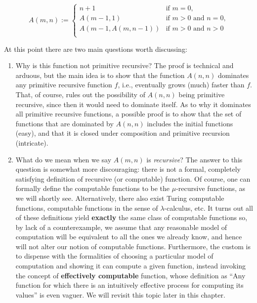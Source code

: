 \documentclass[../main.tex]{memoir}
\begin{document}
\begin{definition}
  \begin{equation*}
    A(m, n) := \left\{
      \begin{array}{lr}
        n + 1 & \text{if } m = 0 \text{,} \\
        A(m - 1, 1) & \text{if } m > 0 \text{ and } n = 0 \text{,} \\
        A(m - 1, A(m, n - 1)) & \text{if } m > 0 \text{ and } n > 0 \\
      \end{array} \right.
  \end{equation*}
\end{definition}

At this point there are two main questions worth discussing:

\begin{enumerate}
\item Why is this function not primitive recursive? The proof is technical and arduous, but the main idea is to show that the function $A(n, n)$ dominates any primitive recursive function $f$, i.e., eventually grows (much) faster than $f$. That, of course, rules out the possibility of $A(n, n)$ being primitive recursive, since then it would need to dominate itself. As to why it dominates all primitive recursive functions, a possible proof is to show that the set of functions that are dominated by $A(n, n)$ includes the initial functions (easy), and that it is closed under composition and primitive recursion (intricate).
\item What do we mean when we say $A(m, n)$ is \textit{recursive}? The answer to this question is somewhat more discouraging: there is not a formal, completely satisfying definition of recursive (or computable) function. Of course, one can formally define the computable functions to be the $\mu$-recursive functions, as we will shortly see. Alternatively, there also exist Turing computable functions, computable functions in the sense of $\lambda$-calculus, etc. It turns out all of these definitions yield \textbf{exactly} the same class of computable functions so, by lack of a counterexample, we assume that any reasonable model of computation will be equivalent to all the ones we already know, and hence will not alter our notion of computable functions. Furthermore, the custom is to dispense with the formalities of choosing a particular model of computation and showing it can compute a given function, instead invoking the concept of \textbf{effectively computable} function, whose definition as ``Any function for which there is an intuitively effective process for computing its values'' is even vaguer. We will revisit this topic later in this chapter.
\end{enumerate}
\end{document}
